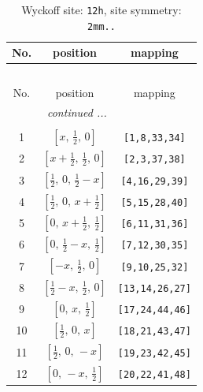 \documentclass[fleqn,8pt]{jsarticle}
\begin{document}
\begin{longtable}{ccc}
\caption{Wyckoff site: {\tt 12h}, site symmetry: {\tt 2mm..}}
 \\
 \hline \hline
No. & position & mapping \\ \hline \endfirsthead

\multicolumn{2}{l}{\tablename\ \thetable{}} \\
 \hline \hline
No. & position & mapping \\ \hline \endhead

 \hline \hline
\multicolumn{2}{r}{\footnotesize\it continued ...} \\ \endfoot

 \hline \hline
\multicolumn{2}{r}{} \\ \endlastfoot

1 & $\left[ x,\, \frac{1}{2},\, 0 \right]$ & {\tt [1,8,33,34]} \\ \hline
2 & $\left[ x + \frac{1}{2},\, \frac{1}{2},\, 0 \right]$ & {\tt [2,3,37,38]} \\ \hline
3 & $\left[ \frac{1}{2},\, 0,\, \frac{1}{2} - x \right]$ & {\tt [4,16,29,39]} \\ \hline
4 & $\left[ \frac{1}{2},\, 0,\, x + \frac{1}{2} \right]$ & {\tt [5,15,28,40]} \\ \hline
5 & $\left[ 0,\, x + \frac{1}{2},\, \frac{1}{2} \right]$ & {\tt [6,11,31,36]} \\ \hline
6 & $\left[ 0,\, \frac{1}{2} - x,\, \frac{1}{2} \right]$ & {\tt [7,12,30,35]} \\ \hline
7 & $\left[ - x,\, \frac{1}{2},\, 0 \right]$ & {\tt [9,10,25,32]} \\ \hline
8 & $\left[ \frac{1}{2} - x,\, \frac{1}{2},\, 0 \right]$ & {\tt [13,14,26,27]} \\ \hline
9 & $\left[ 0,\, x,\, \frac{1}{2} \right]$ & {\tt [17,24,44,46]} \\ \hline
10 & $\left[ \frac{1}{2},\, 0,\, x \right]$ & {\tt [18,21,43,47]} \\ \hline
11 & $\left[ \frac{1}{2},\, 0,\, - x \right]$ & {\tt [19,23,42,45]} \\ \hline
12 & $\left[ 0,\, - x,\, \frac{1}{2} \right]$ & {\tt [20,22,41,48]} \\
\end{longtable}
\renewcommand{\arraystretch}{1.2}
\end{document}
